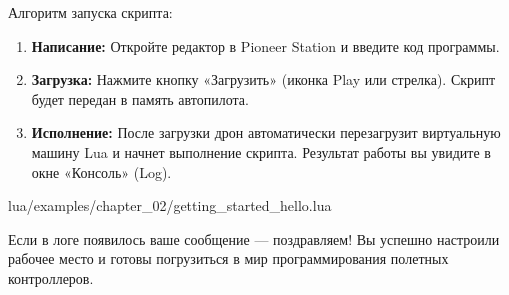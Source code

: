 Алгоритм запуска скрипта:
\begin{enumerate}
    \item \textbf{Написание:} Откройте редактор в Pioneer Station и введите код программы.
    \item \textbf{Загрузка:} Нажмите кнопку «Загрузить» (иконка Play или стрелка). Скрипт будет передан в память автопилота.
    \item \textbf{Исполнение:} После загрузки дрон автоматически перезагрузит виртуальную машину Lua и начнет выполнение скрипта. Результат работы вы увидите в окне «Консоль» (Log).
\end{enumerate}

\begin{codebox}
\begin{codefile}{lua/examples/chapter_02/getting_started_hello.lua}
\end{codefile}
\end{codebox}

Если в логе появилось ваше сообщение — поздравляем! Вы успешно настроили рабочее место и готовы погрузиться в мир программирования полетных контроллеров.
